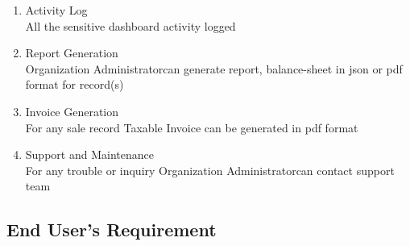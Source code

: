 \documentclass{scrreprt}
\def\admin{Organization Administrator}
\def\user{End User}
\begin{document}
\begin{enumerate}[start=1,label={\bfseries REQ \arabic*:}]
	\item Activity Log
		\\All the sensitive dashboard activity logged 
	\item Report Generation
		\\ \admin \space can generate report, balance-sheet in json or pdf format for record(s)
	\item Invoice Generation
		\\For any sale record Taxable Invoice can be generated in pdf format
	\item Support and Maintenance
		\\For any trouble or inquiry \admin \space can contact support team
	
\end{enumerate}
\subsection{\user's Requirement}
\end{document}
